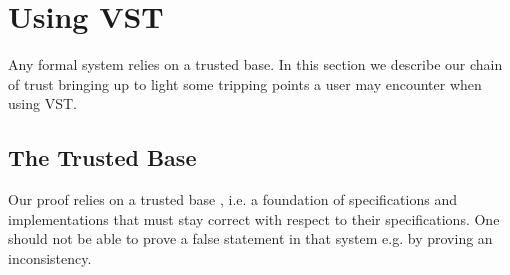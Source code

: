 \section{Using VST}

Any formal system relies on a trusted base. In this section we describe our
chain of trust bringing up to light some tripping points a user may encounter
when using VST.

\subsection{The Trusted Base}

Our proof relies on a trusted base , i.e. a foundation of specifications
and implementations that must stay correct with respect to their specifications.
One should not be able to prove a false statement in that system e.g. by proving
an inconsistency.

